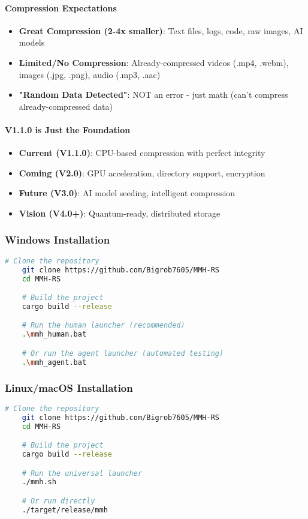 \documentclass[11pt,a4paper]{article}
\begin{document}
	\paragraph{Compression Expectations}
	\begin{itemize}
		\item \textbf{Great Compression (2-4x smaller)}: Text files, logs, code, raw images, AI models
		\item \textbf{Limited/No Compression}: Already-compressed videos (.mp4, .webm), images (.jpg, .png), audio (.mp3, .aac)
		\item \textbf{"Random Data Detected"}: NOT an error - just math (can't compress already-compressed data)
	\end{itemize}
	
	\paragraph{V1.1.0 is Just the Foundation}
	\begin{itemize}
		\item \textbf{Current (V1.1.0)}: CPU-based compression with perfect integrity
		\item \textbf{Coming (V2.0)}: GPU acceleration, directory support, encryption
		\item \textbf{Future (V3.0)}: AI model seeding, intelligent compression
		\item \textbf{Vision (V4.0+)}: Quantum-ready, distributed storage
	\end{itemize}

	\subsubsection{Windows Installation}
	\begin{lstlisting}[language=bash]
	# Clone the repository
	git clone https://github.com/Bigrob7605/MMH-RS
	cd MMH-RS

	# Build the project
	cargo build --release

	# Run the human launcher (recommended)
	.\mmh_human.bat

	# Or run the agent launcher (automated testing)
	.\mmh_agent.bat
	\end{lstlisting}

	\subsubsection{Linux/macOS Installation}
	\begin{lstlisting}[language=bash]
	# Clone the repository
	git clone https://github.com/Bigrob7605/MMH-RS
	cd MMH-RS

	# Build the project
	cargo build --release

	# Run the universal launcher
	./mmh.sh

	# Or run directly
	./target/release/mmh
	\end{lstlisting}
\end{document}
